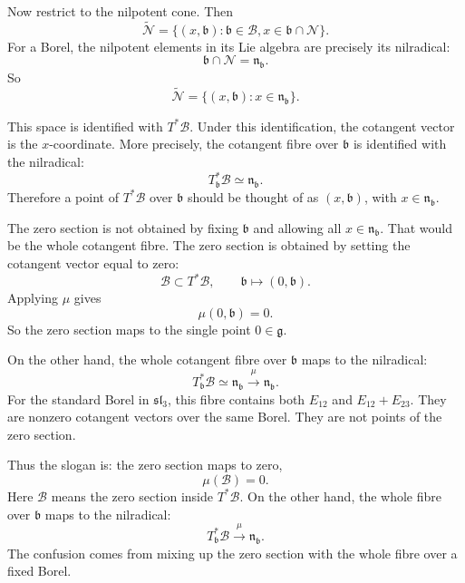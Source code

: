 Now restrict to the nilpotent cone.
Then
$$
\widetilde{\mathcal{N}}
=
\{(x,\mathfrak{b}):
\mathfrak{b}\in\mathcal{B},
x\in\mathfrak{b}\cap\mathcal{N}\}.
$$
For a Borel, the nilpotent elements in
its Lie algebra are precisely its
nilradical:
$$
\mathfrak{b}\cap\mathcal{N}
=
\mathfrak{n}_{\mathfrak{b}}.
$$
So
$$
\widetilde{\mathcal{N}}
=
\{(x,\mathfrak{b}):
x\in\mathfrak{n}_{\mathfrak{b}}\}.
$$

This space is identified with
$T^*\mathcal{B}$. Under this
identification, the cotangent vector is
the $x$-coordinate. More precisely, the
cotangent fibre over $\mathfrak{b}$ is
identified with the nilradical:
$$
T^*_{\mathfrak{b}}\mathcal{B}
\simeq
\mathfrak{n}_{\mathfrak{b}}.
$$
Therefore a point of $T^*\mathcal{B}$
over $\mathfrak{b}$ should be thought of
as $(x,\mathfrak{b})$, with
$x\in\mathfrak{n}_{\mathfrak{b}}$.

The zero section is not obtained by
fixing $\mathfrak{b}$ and allowing all
$x\in\mathfrak{n}_{\mathfrak{b}}$.
That would be the whole cotangent fibre.
The zero section is obtained by setting
the cotangent vector equal to zero:
$$
\mathcal{B}
\subset
T^*\mathcal{B},
\qquad
\mathfrak{b}\longmapsto (0,\mathfrak{b}).
$$
Applying $\mu$ gives
$$
\mu(0,\mathfrak{b})=0.
$$
So the zero section maps to the single
point $0\in\mathfrak{g}$.

On the other hand, the whole cotangent
fibre over $\mathfrak{b}$ maps to the
nilradical:
$$
T^*_{\mathfrak{b}}\mathcal{B}
\simeq
\mathfrak{n}_{\mathfrak{b}}
\xrightarrow{\mu}
\mathfrak{n}_{\mathfrak{b}}.
$$
For the standard Borel in
$\mathfrak{sl}_3$, this fibre contains
both $E_{12}$ and $E_{12}+E_{23}$.
They are nonzero cotangent vectors over
the same Borel. They are not points of
the zero section.

Thus the slogan is: the zero section maps
to zero,
$$
\mu(\mathcal{B})=0.
$$
Here $\mathcal{B}$ means the zero section
inside $T^*\mathcal{B}$. On the other
hand, the whole fibre over
$\mathfrak{b}$ maps to the nilradical:
$$
T^*_{\mathfrak{b}}\mathcal{B}
\xrightarrow{\mu}
\mathfrak{n}_{\mathfrak{b}}.
$$
The confusion comes from mixing up the
zero section with the whole fibre over a
fixed Borel.



